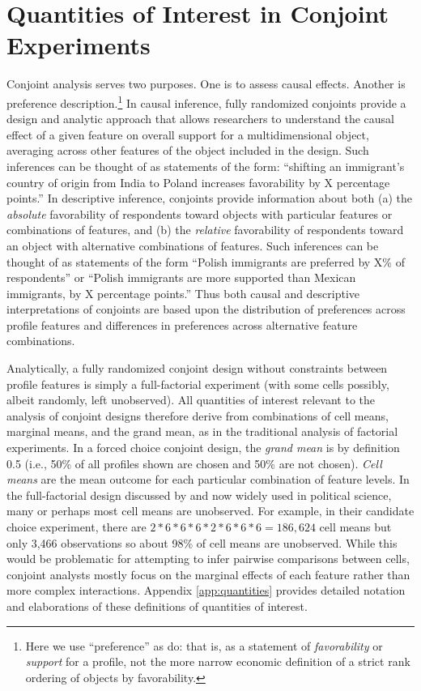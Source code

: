 \documentclass[a4paper,12pt]{article}\usepackage[]{graphicx}\usepackage[]{color}
\begin{document}
\section*{Quantities of Interest in Conjoint Experiments}\label{sec:quantities}

Conjoint analysis serves two purposes. One is to assess causal effects. Another is preference description.\footnote{Here we use ``preference'' as \citet{HainmuellerHopkinsYamamoto2014} do: that is, as a statement of \textit{favorability} or \textit{support} for a profile, not the more narrow economic definition of a strict rank ordering of objects by favorability.} In causal inference, fully randomized conjoints provide a design and analytic approach that allows researchers to understand the causal effect of a given feature on overall support for a multidimensional object, averaging across other features of the object included in the design. Such inferences can be thought of as statements of the form: ``shifting an immigrant's country of origin from India to Poland increases favorability by X percentage points.'' In descriptive inference, conjoints provide information about both (a) the \textit{absolute} favorability of respondents toward objects with particular features or combinations of features, and (b) the \textit{relative} favorability of respondents toward an object with alternative combinations of features. Such inferences can be thought of as statements of the form ``Polish immigrants are preferred by X\% of respondents'' or ``Polish immigrants are more supported than Mexican immigrants, by X percentage points.'' Thus both causal and descriptive interpretations of conjoints are based upon the distribution of preferences across profile features and differences in preferences across alternative feature combinations.

Analytically, a fully randomized conjoint design without constraints between profile features is simply a full-factorial experiment (with some cells possibly, albeit randomly, left unobserved). All quantities of interest relevant to the analysis of conjoint designs therefore derive from combinations of cell means, marginal means, and the grand mean, as in the traditional analysis of factorial experiments. In a forced choice conjoint design, the \textit{grand mean} is by definition 0.5 (i.e., 50\% of all profiles shown are chosen and 50\% are not chosen). \textit{Cell means} are the mean outcome for each particular combination of feature levels. In the full-factorial design discussed by \citet{HainmuellerHopkinsYamamoto2014} and now widely used in political science, many or perhaps most cell means are unobserved. For example, in their candidate choice experiment, there are $2*6*6*6*2*6*6*6 = 186,624$ cell means but only 3,466 observations so about 98\% of cell means are unobserved. While this would be problematic for attempting to infer pairwise comparisons between cells, conjoint analysts mostly focus on the marginal effects of each feature rather than more complex interactions. Appendix \ref{app:quantities} provides detailed notation and elaborations of these definitions of quantities of interest.
\end{document}

